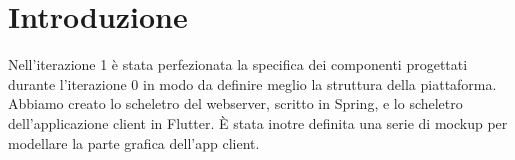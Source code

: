 \section{Introduzione}
Nell’iterazione 1 è stata perfezionata la specifica dei componenti progettati durante l’iterazione 0 in modo da definire meglio la struttura della piattaforma.
Abbiamo creato lo scheletro del webserver, scritto in Spring, e lo scheletro dell'applicazione client in Flutter.
È stata inotre definita una serie di mockup per modellare la parte grafica dell'app client.
